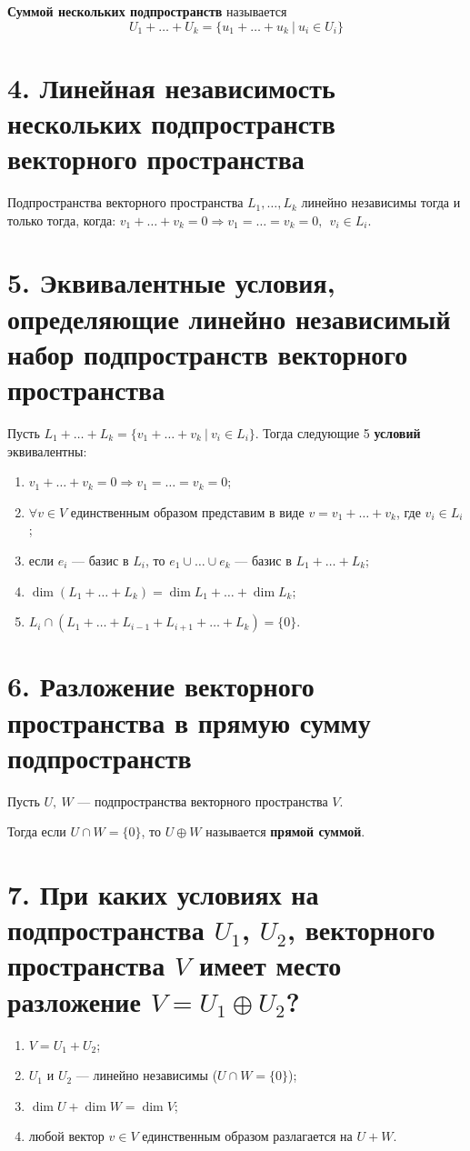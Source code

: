 \documentclass[a4paper, 12pt]{article}
\begin{document}
\textbf{Суммой нескольких подпространств} называется
\[
U_1 + \ldots + U_k = \{u_1 + \ldots + u_k\ |\ u_i \in U_i \}
\]

\section*{4. Линейная независимость нескольких подпространств векторного пространства}
Подпространства векторного пространства $L_1, \ldots, L_k$ линейно независимы тогда и только тогда, когда: $v_1 + \ldots + v_k = 0 \Longrightarrow v_1 = \ldots = v_k = 0,\ \ v_i \in L_i.$

\section*{5. Эквивалентные условия, определяющие линейно независимый набор подпространств векторного пространства}
Пусть $L_1 + \ldots + L_k = \{v_1 + \ldots + v_k\ |\ v_i \in L_i\}$. Тогда следующие 5 \textbf{условий} эквивалентны:
\vspace{-7mm}
\begin{enumerate}
    \itemsep=-0.3em
    \item $v_1 + \ldots + v_k = 0 \Longrightarrow v_1 = \ldots = v_k = 0$;
    \item $\forall v \in V$ единственным образом представим в виде $v = v_1 + \ldots + v_k$, где $v_i \in L_i$;
    \item если $e_i$ --- базис в $L_i$, то $e_1 \cup \ldots \cup e_k$ --- базис в $L_1 + \ldots + L_k$;
    \item $\dim(L_1 + \ldots + L_k) = \dim L_1 + \ldots + \dim L_k$;
    \item $L_i \cap (L_1 + \ldots + L_{i - 1} + L_{i + 1} + \ldots + L_k) = \{0\}$.
\end{enumerate}

\section*{6. Разложение векторного пространства в прямую сумму подпространств}
Пусть $U,\ W$ --- подпространства векторного пространства $V$.

Тогда если $U \cap W = \{0\}$, то $U \oplus W$ называется \textbf{прямой суммой}.

\section*{7. При каких условиях на подпространства $U_1$, $U_2$, векторного пространства $V$ имеет место разложение $V = U_1 \oplus U_2$?}
\begin{enumerate}
    \itemsep=0em
    \item $V = U_1 + U_2$;
    \item $U_1$ и $U_2$ --- линейно независимы ($U \cap W = \{0\}$);
    \item $\dim U + \dim W = \dim V$;
    \item любой вектор $v \in V$ единственным образом разлагается на $U + W$.
\end{enumerate}
\end{document}
